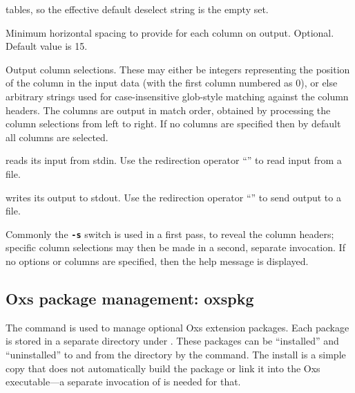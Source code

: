 \begin{description}
  tables, so the effective default deselect string is the empty set.
\item[\optkey{-w colwidth}]
  Minimum horizontal spacing to provide for each column on output.
  Optional.  Default value is 15.
\item[\optkey{col \ldots}]
  Output column selections.  These may either be integers representing
  the position of the column in the input data (with the first column
  numbered as 0), or else arbitrary strings used for case-insensitive
  glob-style matching against the column headers.  The columns are
  output in match order, obtained by processing the column selections
  from left to right.  If no columns are specified then by default all
  columns are selected.
\item[\optkey{\boa infile}]
   reads its input from stdin.  Use the redirection operator
  ``\boa'' to read input from a file.
\item[\optkey{\bca outfile}]
   writes its output to stdout.  Use the redirection operator
  ``\bca'' to send output to a file.
\end{description}
Commonly the \texttt{\textbf{-s}} switch is used in a first pass, to
reveal the column headers; specific column selections may then be made
in a second, separate invocation.  If no options or columns are
specified, then the help message is displayed.


\subsection{Oxs package management:
            oxspkg\label{sec:oxspkg}}%

The  command is used to manage optional Oxs extension
packages.  Each package is stored in a separate directory under
.  These packages can be ``installed'' and
``uninstalled'' to and from the  directory by
the  command.  The install is a simple copy that does not
automatically build the package or link it into the Oxs executable---a
separate invocation of
is needed for that.

